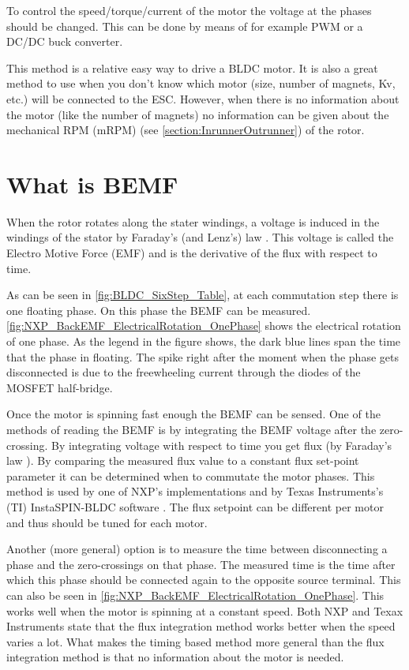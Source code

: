 \documentclass[]{report}
\begin{document}
To control the speed/torque/current of the motor the voltage at the phases should be changed. This can be done by means of for example PWM or a DC/DC buck converter.

This method is a relative easy way to drive a BLDC motor. It is also a great method to use when you don't know which motor (size, number of magnets, Kv, etc.) will be connected to the ESC. However, when there is no information about the motor (like the number of magnets) no information can be given about the mechanical RPM (mRPM) (see \ref{section:InrunnerOutrunner}) of the rotor.

\section{What is BEMF}
When the rotor rotates along the stater windings, a voltage is induced in the windings of the stator by Faraday's (and Lenz's) law \cite{Faradays_Law_concepts}. This voltage is called the Electro Motive Force (EMF) and is the derivative of the flux with respect to time.

As can be seen in \autoref{fig:BLDC_SixStep_Table}, at each commutation step there is one floating phase. On this phase the BEMF can be measured. \autoref{fig:NXP_BackEMF_ElectricalRotation_OnePhase} shows the electrical rotation of one phase. As the legend in the figure shows, the dark blue lines span the time that the phase in floating. The spike right after the moment when the phase gets disconnected is due to the freewheeling current through the diodes of the MOSFET half-bridge.

Once the motor is spinning fast enough the BEMF can be sensed. One of the methods of reading the BEMF is by integrating the BEMF voltage after the zero-crossing. By integrating voltage with respect to time you get flux (by Faraday's law \cite{Faradays_Law_concepts}). By comparing the measured flux value to a constant flux set-point parameter it can be determined when to commutate the motor phases. This method is used by one of NXP's implementations \cite{NXP_AN4597} and by Texas Instruments's (TI) InstaSPIN-BLDC software \cite{TI_InstaSPIN_BLDC}. The flux setpoint can be different per motor and thus should be tuned for each motor.

Another (more general) option is to measure the time between disconnecting a phase and the zero-crossings on that phase. The measured time is the time after which this phase should be connected again to the opposite source terminal. This can also be seen in \autoref{fig:NXP_BackEMF_ElectricalRotation_OnePhase}. This works well when the motor is spinning at a constant speed. Both NXP and Texax Instruments state that the flux integration method works better when the speed varies a lot. What makes the timing based method more general than the flux integration method is that no information about the motor is needed.
\end{document}
